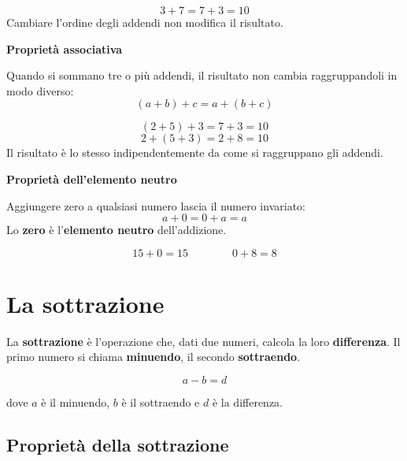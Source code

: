 \begin{esempio}
  \[
    3 + 7 = 7 + 3 = 10
  \]
  Cambiare l'ordine degli addendi non modifica il risultato.
\end{esempio}

\begin{regola}
  \textbf{Proprietà associativa}

  Quando si sommano tre o più addendi, il risultato non cambia raggruppandoli in modo diverso:
  \[
    (a + b) + c = a + (b + c)
  \]
\end{regola}

\begin{esempio}
  \[
    (2 + 5) + 3 = 7 + 3 = 10
  \]
  \[
    2 + (5 + 3) = 2 + 8 = 10
  \]
  Il risultato è lo stesso indipendentemente da come si raggruppano gli addendi.
\end{esempio}

\begin{regola}
  \textbf{Proprietà dell'elemento neutro}

  Aggiungere zero a qualsiasi numero lascia il numero invariato:
  \[
    a + 0 = 0 + a = a
  \]
  Lo \textbf{zero} è l'\textbf{elemento neutro} dell'addizione.
\end{regola}

\begin{esempio}
  \[
    15 + 0 = 15 \qquad \qquad 0 + 8 = 8
  \]
\end{esempio}

\section{La sottrazione}

\begin{definizione}
  La \textbf{sottrazione} è l'operazione che, dati due numeri, calcola la loro \textbf{differenza}. Il primo numero si chiama \textbf{minuendo}, il secondo \textbf{sottraendo}.

  \[
    a - b = d
  \]

  dove $a$ è il minuendo, $b$ è il sottraendo e $d$ è la differenza.
\end{definizione}

\subsection{Proprietà della sottrazione}

